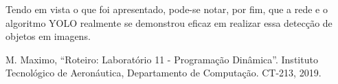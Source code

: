 \documentclass[conference]{IEEEtran}
\begin{document}
Tendo em vista o que foi apresentado, pode-se notar, por fim, que a rede e o algoritmo YOLO realmente se demonstrou eficaz em realizar essa detecção de objetos em imagens.

\begin{thebibliography}{00}
 M. Maximo, ``Roteiro: Laboratório 11 - Programação Dinâmica''. Instituto Tecnológico de Aeronáutica, Departamento de Computação. CT-213, 2019.
\end{thebibliography}
\end{document}
